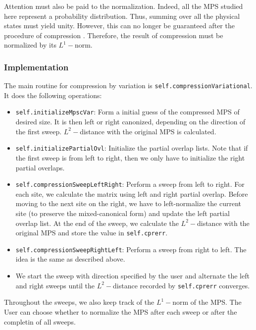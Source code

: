 \documentclass[english]{article}
\begin{document}
Attention must also be paid to the normalization. Indeed, all the MPS studied here represent a probability distribution. Thus, summing over all the physical states must yield unity. However, this can no longer be guaranteed after the procedure of compression . Therefore, the result of compression must be normalized by its $L^1-$norm.

\subsubsection{Implementation}
The main routine for compression by variation is \texttt{self.compressionVariational}. It does the following operations:
\begin{itemize}
\item \texttt{self.initializeMpscVar}: Form a initial guess of the compressed MPS of desired size. It is then left or right canonized, depending on the direction of the first sweep. $L^2-$distance with the original MPS is calculated. 
\item \texttt{self.initializePartialOvl}: Initialize the partial overlap lists. Note that if the first sweep is from left to right, then we only have to initialize the right partial overlaps.
\item \texttt{self.compressionSweepLeftRight}: Perform a sweep from left to right. For each site, we calculate the matrix using left and right partial overlap. Before moving to the next site on the right, we have to left-normalize the current site (to preserve the mixed-canonical form) and update the left partial overlap list. At the end of the sweep, we calculate the $L^2-$distance with the original MPS and store the value in \texttt{self.cpr\textunderscore err}.
\item \texttt{self.compressionSweepRightLeft}: Perform a sweep from right to left. The idea is the same as described above.
\item We start the sweep with direction specified by the user and alternate the left and right sweeps until the $L^2-$distance recorded by \texttt{self.cpr\textunderscore err} converges.
\end{itemize}
Throughout the sweeps, we also keep track of the $L^1-$norm of the MPS. The User can choose whether to normalize the MPS after each sweep or after the completin of all sweeps.
\end{document}

